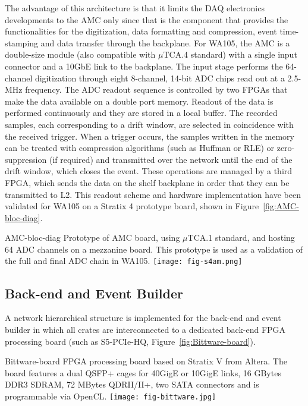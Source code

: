 The advantage of this architecture is that it limits the DAQ electronics
developments to the AMC only since that is the component that provides
the functionalities for the digitization, data formatting and
compression, event time-stamping and data transfer through the
backplane. For WA105, the AMC is a double-size module (also compatible
with $\mu$TCA.4 standard) with a single input connector and a 10GbE
link to the backplane. The input stage performs the 64-channel
digitization through eight 8-channel, 14-bit ADC chips read out at a
2.5-MHz frequency. The ADC readout sequence is controlled by two FPGAs
that make the data available on a double port memory. Readout of the
data is performed continuously and they are stored in a local
buffer. The recorded samples, each corresponding to a drift window, are
selected in coincidence with the received trigger. When a trigger
occurs, the samples written in the memory can be treated with
compression algorithms (such as Huffman or RLE) or zero-suppression
(if required) and transmitted over the network until the end of the
drift window, which closes the event. These operations are managed by a
third FPGA, which sends the data on the shelf backplane in order that they can be transmitted to L2.  
This readout scheme and hardware implementation have been validated for WA105 on a
Stratix 4 prototype board, shown in Figure~\ref{fig:AMC-bloc-diag}.


\begin{cdrfigure}{AMC-bloc-diag}
{\small Prototype of AMC board, using $\mu$TCA.1 standard, and hosting 
64 ADC channels on a mezzanine board. This prototype is used as a validation 
of the full and final ADC chain in WA105.}
\texttt{[image: fig-s4am.png]}
\end{cdrfigure}

\subsection{Back-end and Event Builder}


A network hierarchical structure is implemented for the back-end and event builder in which all crates are
interconnected to a dedicated back-end FPGA processing board (such as
S5-PCIe-HQ, Figure~\ref{fig:Bittware-board}).

\begin{cdrfigure}{Bittware-board}
{\small FPGA processing board based on Stratix V from Altera. The board 
features a dual QSFP+ cages for 40GigE or 10GigE links, 16 GBytes DDR3 SDRAM, 
72 MBytes QDRII/II+, two SATA connectors and is programmable via OpenCL.}
\texttt{[image: fig-bittware.jpg]}
\end{cdrfigure}

